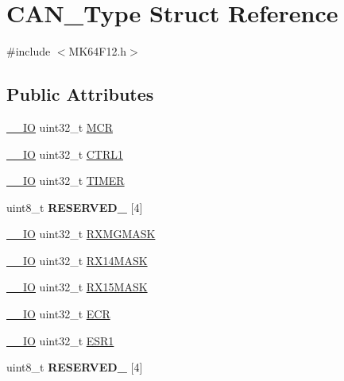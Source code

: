 \hypertarget{structCAN__Type}{}\section{C\+A\+N\+\_\+\+Type Struct Reference}
\label{structCAN__Type}


{\ttfamily \#include $<$M\+K64\+F12.\+h$>$}

\subsection*{Public Attributes}
\begin{DoxyCompactItemize}
\item 
\hyperlink{core__sc300_8h_aec43007d9998a0a0e01faede4133d6be}{\+\_\+\+\_\+\+IO} uint32\+\_\+t \hyperlink{structCAN__Type_ad73bb76d98c915b02cad2772fa4f2411}{M\+CR}
\item 
\hyperlink{core__sc300_8h_aec43007d9998a0a0e01faede4133d6be}{\+\_\+\+\_\+\+IO} uint32\+\_\+t \hyperlink{structCAN__Type_a7ae40587a0ab05c822ca101757875904}{C\+T\+R\+L1}
\item 
\hyperlink{core__sc300_8h_aec43007d9998a0a0e01faede4133d6be}{\+\_\+\+\_\+\+IO} uint32\+\_\+t \hyperlink{structCAN__Type_afa5910590a69d21acc036991b3339982}{T\+I\+M\+ER}
\item 
uint8\+\_\+t {\bfseries R\+E\+S\+E\+R\+V\+E\+D\+\_} \mbox{[}4\mbox{]}\hypertarget{structCAN__Type_a0fd279cc8967fc6580418319427b7fd6}{}\label{structCAN__Type_a0fd279cc8967fc6580418319427b7fd6}

\item 
\hyperlink{core__sc300_8h_aec43007d9998a0a0e01faede4133d6be}{\+\_\+\+\_\+\+IO} uint32\+\_\+t \hyperlink{structCAN__Type_a0bd83d586aff02537abbe1a3680d960f}{R\+X\+M\+G\+M\+A\+SK}
\item 
\hyperlink{core__sc300_8h_aec43007d9998a0a0e01faede4133d6be}{\+\_\+\+\_\+\+IO} uint32\+\_\+t \hyperlink{structCAN__Type_a3d48b30abe2b822887ce75dc3668ff6f}{R\+X14\+M\+A\+SK}
\item 
\hyperlink{core__sc300_8h_aec43007d9998a0a0e01faede4133d6be}{\+\_\+\+\_\+\+IO} uint32\+\_\+t \hyperlink{structCAN__Type_a0dbf70b6381b014cd0ee53d573ba13c7}{R\+X15\+M\+A\+SK}
\item 
\hyperlink{core__sc300_8h_aec43007d9998a0a0e01faede4133d6be}{\+\_\+\+\_\+\+IO} uint32\+\_\+t \hyperlink{structCAN__Type_a561aab7ad4e38ae9ba75477bfbd74c63}{E\+CR}
\item 
\hyperlink{core__sc300_8h_aec43007d9998a0a0e01faede4133d6be}{\+\_\+\+\_\+\+IO} uint32\+\_\+t \hyperlink{structCAN__Type_a9dfb3d60755ae52396ecafaf50ab3424}{E\+S\+R1}
\item 
uint8\+\_\+t {\bfseries R\+E\+S\+E\+R\+V\+E\+D\+\_} \mbox{[}4\mbox{]}\hypertarget{structCAN__Type_a40a8663947a4554012d6a2804dee509d}{}\label{structCAN__Type_a40a8663947a4554012d6a2804dee509d}


\end{DoxyCompactItemize}
